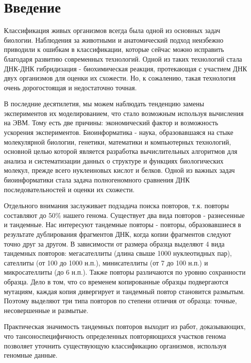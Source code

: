 \chapter*{Введение}							%

Классификация живых организмов всегда была одной из основных задач биологии.
Наблюдения за животными и анатомический подход неизбежно приводили к ошибкам
в классификации, которые сейчас можно исправить благодаря развитию современных
технологий. Одной из таких технологий стала ДНК-ДНК гибридизация - биохимическая
реакция, протекающая с участием ДНК двух организмов для оценки их схожести.
Но, к сожалению, такая технология очень дорогостоящая и недостаточно точная.

В последние десятилетия, мы можем наблюдать тенденцию замены экспериментов
их моделированием, что стало возможным используя вычисления на ЭВМ. Тому есть
две причины: экономический фактор и возможность ускорения экспериментов.
Биоинформатика - наука, образовавшаяся на стыке молекулярной биологии, генетики,
математики и компьютерных технологий, основной целью которой является разработка
вычислительных алгоритмов для анализа и систематизации данных о структуре и
функциях биологических молекул, прежде всего нуклеиновых кислот и белков.
Одной из важных задач биоинформатики стала задача полногеномного сравнения ДНК
последовательностей и оценки их схожести.

Отдельного внимания заслуживает подзадача поиска повторов, т.к. повторы составляют
до 50\% нашего генома. Существует два вида повторов - разнесенные и тандемные.
Нас интересуют тандемные повторы - повторы, образовавшиеся в результате дублирования
фрагментов ДНК, когда копии фрагментов следуют точно друг за другом.
В зависимости от размера образца выделяют 4 вида тандемных повторов: мегасателлиты
(длина свыше 1000 нуклеотидных пар), сателлиты (от 100 до 1000 н.п.), минисателлиты
(от 7 до 100 н.п.) и микросателлиты (до 6 н.п.). Также повторы различаются
по уровню сохранности образца. Дело в том, что со временем копированные образцы 
подвергаются мутациям, каждая копия дивергирует и тандемный повтор становится
размытым. Поэтому выделяют три типа повторов по степени отличия от образца:
точные, несовершенные и размытые.

Практическая значимость тандемных повторов выходит из работ, доказывающих, что
тансоноспецифичность определенных повторяющихся участков генома позволяет
уточнить существующую классификацию организмов, используя геномные данные.

